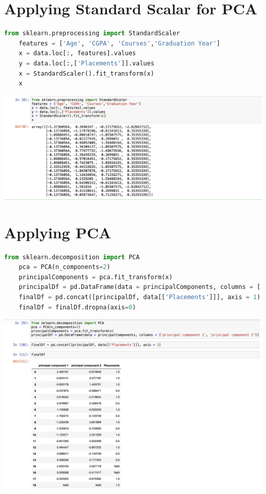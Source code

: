 \documentclass{article}
\begin{document}
\section{Applying Standard Scalar for PCA}
\begin{lstlisting}[language=Python]
	from sklearn.preprocessing import StandardScaler
	features = ['Age', 'CGPA', 'Courses','Graduation Year']
	x = data.loc[:, features].values
	y = data.loc[:,['Placements']].values
	x = StandardScaler().fit_transform(x)
	x
\end{lstlisting}
\includegraphics[scale=0.45]{images/3.png}
\section{Applying PCA}
\begin{lstlisting}[language=Python]
	from sklearn.decomposition import PCA
	pca = PCA(n_components=2)
	principalComponents = pca.fit_transform(x)
	principalDf = pd.DataFrame(data = principalComponents, columns = ['principal component 1', 'principal component 2'])
	finalDf = pd.concat([principalDf, data[['Placements']]], axis = 1)
	finalDf = finalDf.dropna(axis=0)
\end{lstlisting}
\includegraphics[scale=0.45]{images/4.png}
\end{document}
